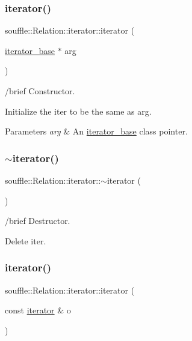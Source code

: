 \subsubsection{\texorpdfstring{iterator()}{iterator()}\hspace{0.1cm}{\footnotesize\ttfamily [2/3]}}
{\footnotesize\ttfamily souffle\+::\+Relation\+::iterator\+::iterator (\begin{DoxyParamCaption}\item[{\hyperlink{classsouffle_1_1_relation_1_1iterator__base}{iterator\+\_\+base} $\ast$}]{arg }\end{DoxyParamCaption})\hspace{0.3cm}{\ttfamily [inline]}}

/brief Constructor.

Initialize the iter to be the same as arg. 
\begin{DoxyParams}{Parameters}
{\em arg} & An \hyperlink{classsouffle_1_1_relation_1_1iterator__base}{iterator\+\_\+base} class pointer. \\
\hline
\end{DoxyParams}
\mbox{\label{classsouffle_1_1_relation_1_1iterator_a94498a0b884923e32b2ecbbb31b1fad4}} 
\subsubsection{\texorpdfstring{$\sim$iterator()}{~iterator()}}
{\footnotesize\ttfamily souffle\+::\+Relation\+::iterator\+::$\sim$iterator (\begin{DoxyParamCaption}{ }\end{DoxyParamCaption})\hspace{0.3cm}{\ttfamily [inline]}}

/brief Destructor.

Delete iter. \mbox{\label{classsouffle_1_1_relation_1_1iterator_a6324ca05414e80ea983220ad01ee9a64}} 
\subsubsection{\texorpdfstring{iterator()}{iterator()}\hspace{0.1cm}{\footnotesize\ttfamily [3/3]}}
{\footnotesize\ttfamily souffle\+::\+Relation\+::iterator\+::iterator (\begin{DoxyParamCaption}\item[{const \hyperlink{classsouffle_1_1_relation_1_1iterator}{iterator} \&}]{o }\end{DoxyParamCaption})\hspace{0.3cm}{\ttfamily [inline]}}

